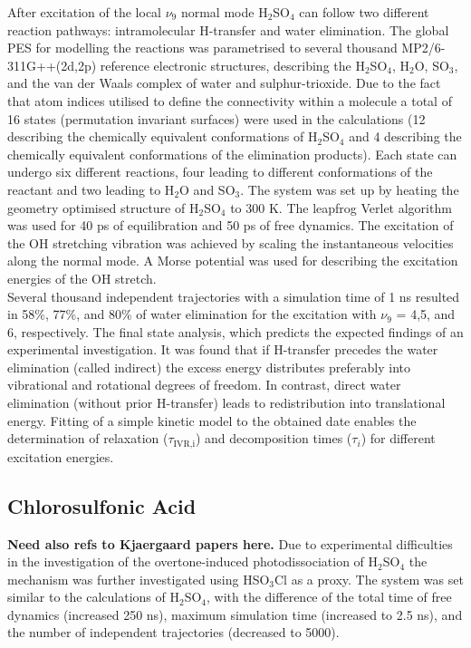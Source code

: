 \documentclass[journal=jacsat,manuscript=article]{achemso}
\begin{document}
\noindent
After excitation of the local $\nu_9$ normal mode H$_2$SO$_4$ can
follow two different reaction pathways: intramolecular H-transfer and
water elimination. The global PES for modelling the reactions was
parametrised to several thousand MP2/6-311G++(2d,2p) reference
electronic structures, describing the H$_2$SO$_4$, H$_2$O, SO$_3$, and
the van der Waals complex of water and sulphur-trioxide. Due to the
fact that atom indices utilised to define the connectivity within a
molecule a total of 16 states (permutation invariant surfaces) were
used in the calculations (12 describing the chemically equivalent
conformations of H$_2$SO$_4$ and 4 describing the chemically
equivalent conformations of the elimination products). Each state can
undergo six different reactions, four leading to different
conformations of the reactant and two leading to H$_2$O and
SO$_3$. The system was set up by heating the geometry optimised
structure of H$_2$SO$_4$ to 300 K. The leapfrog Verlet algorithm was
used for 40 ps of equilibration and 50 ps of free dynamics. The
excitation of the OH stretching vibration was achieved by scaling the
instantaneous velocities along the normal mode. A Morse potential was
used for describing the excitation energies of the OH stretch.\\

\noindent
Several thousand independent trajectories with a simulation time of 1
ns resulted in 58\%, 77\%, and 80\% of water elimination for the
excitation with $\nu_9$ = 4,5, and 6, respectively. The final state
analysis, which predicts the expected findings of an experimental
investigation. It was found that if H-transfer precedes the water
elimination (called indirect) the excess energy distributes preferably
into vibrational and rotational degrees of freedom. In contrast,
direct water elimination (without prior H-transfer) leads to
redistribution into translational energy. Fitting of a simple kinetic
model to the obtained date enables the determination of relaxation
($\tau_{\text{IVR,i}}$) and decomposition times ($\tau_i$) for
different excitation energies.\\

\subsection{Chlorosulfonic Acid}

\noindent
{\bf Need also refs to Kjaergaard papers here.} Due to experimental
difficulties in the investigation of the overtone-induced
photodissociation of H$_2$SO$_4$ the mechanism was further
investigated using HSO$_3$Cl as a
proxy\cite{reyesbrickel.pccp.2016.msarmd}. The system was set similar
to the calculations of H$_2$SO$_4$, with the difference of the total
time of free dynamics (increased 250 ns), maximum simulation time
(increased to 2.5 ns), and the number of independent trajectories
(decreased to 5000).\\
\end{document}
